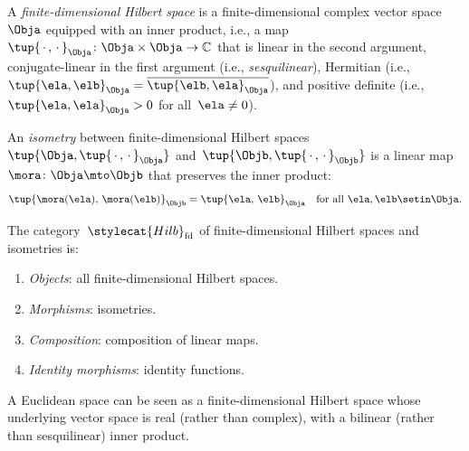 \begin{ctdefinition}
    \label{def:cat-of-hilbert-isometries}
    A \emph{finite-dimensional Hilbert space} is a finite-dimensional complex vector space~$\Obja$ equipped with an inner product, i.e., a map~$\tup{\,\cdot\,,\,\cdot\,}_\Obja \colon \Obja \times \Obja \to \mathbb{C}$ that is linear in the second argument, conjugate-linear in the first argument (i.e., \emph{sesquilinear}), Hermitian (i.e.,~$\tup{\ela, \elb}_\Obja = \overline{\tup{\elb, \ela}_\Obja}$), and positive definite (i.e.,~$\tup{\ela, \ela}_\Obja > 0$ for all~$\ela \neq 0$).

    An \emph{isometry} between finite-dimensional Hilbert spaces~$\tup{\Obja, \tup{\,\cdot\,,\,\cdot\,}_\Obja}$ and~$\tup{\Objb, \tup{\,\cdot\,,\,\cdot\,}_\Objb}$ is a linear map~$\mora \colon \Obja \mto \Objb$ that preserves the inner product:
    \begin{equation}
        \tup{\mora(\ela),\, \mora(\elb)}_\Objb = \tup{\ela,\, \elb}_\Obja \quad \text{for all } \ela, \elb \setin \Obja.
    \end{equation}

    The category~$\stylecat{Hilb}_{\mathrm{fd}}$ of finite-dimensional Hilbert spaces and isometries is:
    \begin{enumerate}
        \item \emph{Objects}: all finite-dimensional Hilbert spaces.
        \item \emph{Morphisms}: isometries.
        \item \emph{Composition}: composition of linear maps.
        \item \emph{Identity morphisms}: identity functions.
    \end{enumerate}
\end{ctdefinition}

\begin{remark}
    A Euclidean space can be seen as a finite-dimensional Hilbert space whose underlying vector space is real (rather than complex), with a bilinear (rather than sesquilinear) inner product.
\end{remark}

